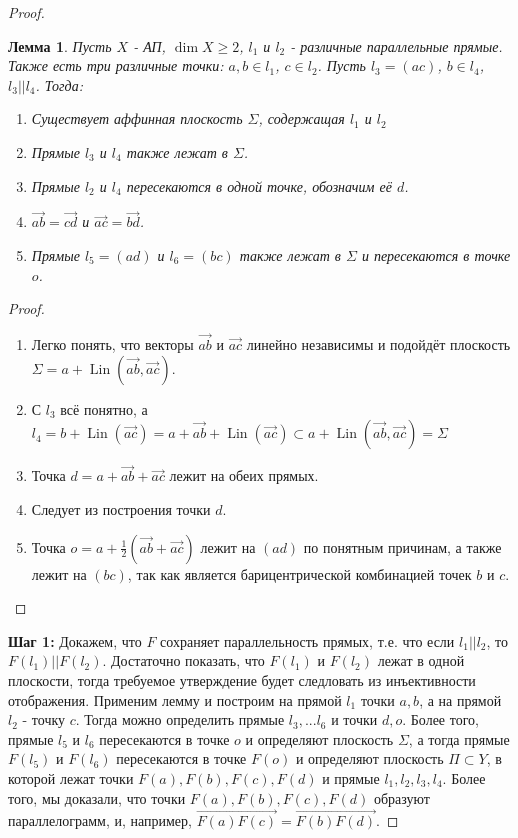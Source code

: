 \documentclass[a4paper,100pt]{article}
\theoremstyle{indented}
\newtheorem{lemma}{Лемма}
\theoremstyle{definition}
\theoremstyle{remark}
\DeclareMathOperator{\Lin}{Lin}
\begin{document}
\begin{proof}
    \begin{lemma}
    Пусть $X$ - АП, $\dim X \geq 2$, $l_1$ и $l_2$ - различные параллельные прямые. Также есть три различные точки: $a, b \in l_1$, $c \in l_2$. Пусть $l_3=(ac)$, $b \in l_4$, $l_3 || l_4$. Тогда:
    \begin{enumerate}
        \item Существует аффинная плоскость $\Sigma$, содержащая $l_1$ и $l_2$
        \item Прямые $l_3$ и $l_4$ также лежат в $\Sigma$.
        \item Прямые $l_2$ и $l_4$ пересекаются в одной точке, обозначим её $d$.
        \item $\vec{ab}=\vec{cd}$ и $\vec{ac}=\vec{bd}$. 
        \item Прямые $l_5=(ad)$ и $l_6=(bc)$ также лежат в $\Sigma$ и пересекаются в точке $o$.
    \end{enumerate}
    \end{lemma}
    \begin{proof}
    \begin{enumerate}
        \item Легко понять, что векторы $\vec{ab}$ и $\vec{ac}$ линейно независимы и подойдёт плоскость $\Sigma=a+\Lin(\vec{ab}, \vec{ac})$.
        \item С $l_3$ всё понятно, а $l_4=b+\Lin(\vec{ac})=a+\vec{ab}+\Lin(\vec{ac}) \subset a+\Lin(\vec{ab}, \vec{ac}) =\Sigma$
        \item Точка $d=a+\vec{ab}+\vec{ac}$ лежит на обеих прямых.
        \item Следует из построения точки $d$.
        \item Точка $o=a+\frac{1}{2}(\vec{ab}+\vec{ac})$ лежит на $(ad)$ по понятным причинам, а также лежит на $(bc)$, так как является барицентрической комбинацией точек $b$ и $c$.
    \end{enumerate}
    \end{proof}
    \textbf{Шаг 1:} Докажем, что $F$ сохраняет параллельность прямых, т.е. что если $l_1 || l_2$, то $F(l_1) || F(l_2)$. Достаточно показать, что $F(l_1)$ и $F(l_2) $ лежат в одной плоскости, тогда требуемое утверждение будет следловать из инъективности отображения. Применим лемму и построим на прямой $l_1$ точки $a, b$, а на прямой $l_2$ - точку $c$. Тогда можно определить прямые $l_3, ... l_6$ и точки $d, o$. Более того, прямые $l_5$ и $l_6$ пересекаются в точке $o$ и определяют плоскость $\Sigma$, а тогда прямые $F(l_5)$ и $F(l_6)$ пересекаются в точке $F(o)$ и определяют плоскость $\Pi \subset Y$, в которой лежат точки $F(a), F(b), F(c), F(d)$ и прямые $l_1, l_2, l_3, l_4$. Более того, мы доказали, что точки $F(a), F(b), F(c), F(d)$ образуют параллелограмм, и, например, $\overrightarrow{F(a)F(c)}=\overrightarrow{F(b)F(d)}$.

\end{proof}
\end{document}
